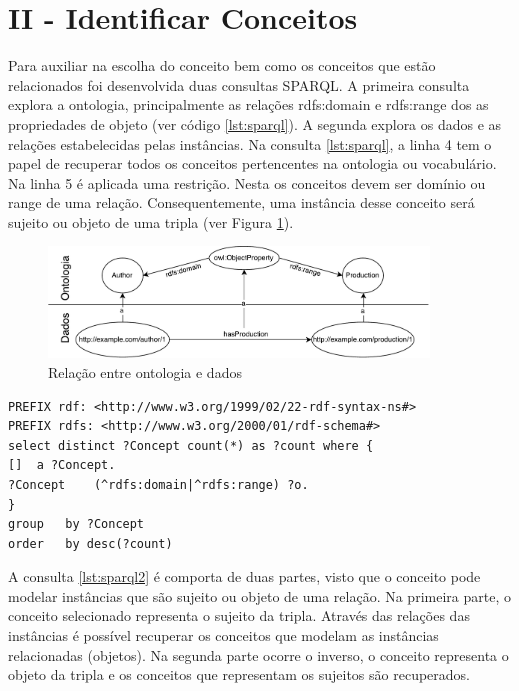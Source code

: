 \section{II - Identificar Conceitos}
Para auxiliar na escolha do conceito bem como os conceitos que estão relacionados foi desenvolvida duas consultas SPARQL. A primeira consulta explora a ontologia, principalmente as relações rdfs:domain e rdfs:range dos  as propriedades de objeto (ver código \ref{lst:sparql}). A segunda explora os dados e as relações estabelecidas pelas instâncias.
Na consulta \ref{lst:sparql}, a linha 4 tem o papel de recuperar todos os conceitos pertencentes na ontologia ou vocabulário. Na linha 5 é aplicada uma restrição. Nesta os conceitos devem ser domínio ou range de uma relação. Consequentemente, uma instância desse conceito será sujeito ou objeto de uma tripla (ver Figura \ref{fig:subgrafo1}).
\begin{figure}[!ht]
	\centering
	\includegraphics[width=0.9\textwidth]{./imagens/subgrafo_semantico.pdf}
	\caption{Relação entre ontologia e dados}
	\label{fig:subgrafo1}
\end{figure}

\begin{lstlisting}[captionpos=b, caption= Consulta SPARQL para identificação de conceito, label=lst:sparql,
basicstyle=\ttfamily,frame=single]
PREFIX rdf: <http://www.w3.org/1999/02/22-rdf-syntax-ns#>
PREFIX rdfs: <http://www.w3.org/2000/01/rdf-schema#>
select distinct ?Concept count(*) as ?count where {
[] 	a ?Concept.
?Concept 	(^rdfs:domain|^rdfs:range) ?o.
}
group 	by ?Concept	
order 	by desc(?count)
\end{lstlisting}

A consulta \ref{lst:sparql2} é comporta de duas partes, visto que o conceito pode modelar instâncias que são sujeito ou objeto de uma relação. Na primeira parte, o conceito selecionado representa o sujeito da tripla. Através das relações das instâncias é possível recuperar os conceitos que modelam as instâncias  relacionadas (objetos). Na segunda parte ocorre o inverso, o conceito representa o objeto da tripla e os conceitos que representam os sujeitos são recuperados.

